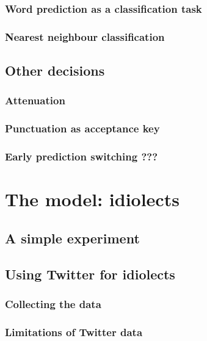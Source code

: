 \documentclass[12pt]{article}
\let\stdsection\section
\renewcommand\section{\newpage\stdsection}
\begin{document}
\subsubsection{Word prediction as a classification task}

\subsubsection{Nearest neighbour classification}

\subsection{Other decisions}

\subsubsection{Attenuation}

\subsubsection{Punctuation as acceptance key}

\subsubsection{Early prediction switching ???} \label{early}





\section{The model: idiolects} \label{model}

\subsection{A simple experiment}

\subsection{Using Twitter for idiolects}

\subsubsection{Collecting the data}

\subsubsection{Limitations of Twitter data}
\end{document}
